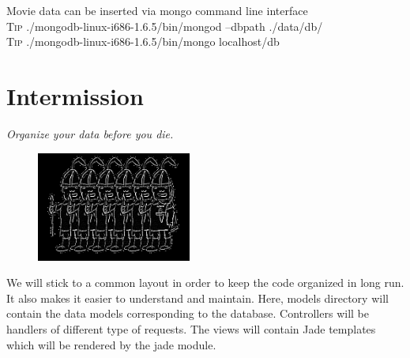 \documentclass[12pt]{book}
\begin{document}
\vspace{0.6cm}\vspace{0.6cm}

Movie data can be inserted via mongo command line interface \\
\colorbox{tipcolour}{\tiny \textsc{Tip} \small ./mongodb-linux-i686-1.6.5/bin/mongod --dbpath ./data/db/ } \\
\colorbox{tipcolour}{\tiny \textsc{Tip} \small ./mongodb-linux-i686-1.6.5/bin/mongo localhost/db } \\
\par





\chapter{Intermission}
\begin{flushright}\textit{Organize your data before you die.}\end{flushright}

\begin{figure}
\begin{center}\includegraphics[width=2in]{org/art/organized.png}\end{center}
\end{figure}

We will stick to a common layout in order to keep the code organized in long run. It also makes it easier to understand and maintain. Here, models directory will contain the data models corresponding to the database. Controllers will be handlers of different type of requests. The views will contain Jade templates which will be rendered by the jade module.
\linebreak
\end{document}
